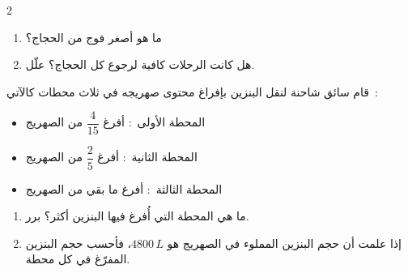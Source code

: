 \documentclass[a4paper,11pt]{article}
\newcommand{\exnum}[1]{%
  \tikz[baseline=(n.base)]\node[circle,draw=headerblue,fill=blue!10,
    inner sep=1.5pt,line width=0.7pt,font=\small\bfseries](n){%
    \textLR{#1}};%
}
\newcommand{\exercice}[1]{%
  \vspace{5pt}%
  \noindent{\color{headerblue}\bfseries\small تمرين~:~\exnum{#1}}%
  \vspace{2pt}\par\noindent%
}
\newlength{\exskip}
\begin{document}
\begin{multicols}{2}
\begin{enumerate}
  \item ما هو أصغر فوج من الحجاج؟
  \item هل كانت الرحلات كافية لرجوع كل
        الحجاج؟ علّل.
\end{enumerate}

\vspace{\exskip}
\exercice{22}
قام سائق شاحنة لنقل البنزين بإفراغ محتوى صهريجه
في ثلاث محطات كالآتي~:

\vspace{3pt}
\begin{tcolorbox}[
  colback=gray!8,colframe=gray!50,
  arc=3pt,boxrule=0.8pt,
  left=5pt,right=5pt,top=3pt,bottom=3pt
]
\begin{itemize}[leftmargin=*,label=\textbullet]
  \item المحطة الأولى~: أفرغ $\dfrac{4}{15}$ من الصهريج
  \item المحطة الثانية~: أفرغ $\dfrac{2}{5}$ من الصهريج
  \item المحطة الثالثة~: أفرغ ما بقي من الصهريج
\end{itemize}
\end{tcolorbox}

\begin{enumerate}
  \item ما هي المحطة التي أُفرغ فيها البنزين أكثر؟ برر.
  \item إذا علمت أن حجم البنزين المملوء في الصهريج
        هو $4800\,L$، فأحسب حجم البنزين المفرّغ
        في كل محطة.
\end{enumerate}

\end{multicols}

\vfill
\begin{center}
\end{center}
\end{document}
